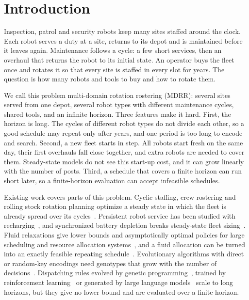 \section{Introduction}
\label{sec:intro}


Inspection, patrol and security robots keep many sites staffed around the clock.
Each robot serves a duty at a site, returns to its depot and is maintained before it leaves again.
Maintenance follows a cycle: a few short services, then an overhaul that returns the robot to its initial state.
An operator buys the fleet once and rotates it so that every site is staffed in every slot for years.
The question is how many robots and tools to buy and how to rotate them.

We call this problem multi-domain rotation rostering (MDRR): several sites served from one depot, several robot types with different maintenance cycles, shared tools, and an infinite horizon.
Three features make it hard.
First, the horizon is long.
The cycles of different robot types do not divide each other, so a good schedule may repeat only after years, and one period is too long to encode and search.
Second, a new fleet starts in step.
All robots start fresh on the same day, their first overhauls fall close together, and extra robots are needed to cover them.
Steady-state models do not see this start-up cost, and it can grow linearly with the number of posts.
Third, a schedule that covers a finite horizon can run short later, so a finite-horizon evaluation can accept infeasible schedules.

Existing work covers parts of this problem.
Cyclic staffing, crew rostering and rolling stock rotation planning optimize a steady state in which the fleet is already spread over its cycles~\cite{bartholdi1980cyclic,breugem2023threephase,wang2024rollingstock,feng2024branchprice}.
Persistent robot service has been studied with recharging~\cite{asghar2025multirobot,arribas2023uav,kumar2025persistent}, and synchronized battery depletion breaks steady-state fleet sizing~\cite{ramesh2026robust}.
Fluid relaxations give lower bounds and asymptotically optimal policies for large scheduling and resource allocation systems~\cite{bertsimas2002fluid,brown2025fluid,gast2024lp}, and a fluid allocation can be turned into an exactly feasible repeating schedule~\cite{zheng2026highmultiplicity}.
Evolutionary algorithms with direct or random-key encodings need genotypes that grow with the number of decisions~\cite{londe2025brkga,ding2024hfmae}.
Dispatching rules evolved by genetic programming~\cite{zhang2024survey,xu2024lexicase}, trained by reinforcement learning~\cite{song2023fjsp,liu2025trainer} or generated by large language models~\cite{liu2024eoh,ye2024reevo,yu2026lsh} scale to long horizons, but they give no lower bound and are evaluated over a finite horizon.

